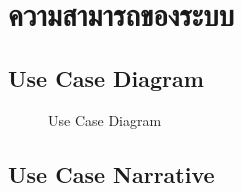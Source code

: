 \section{ความสามารถของระบบ}
\subsection{Use Case Diagram}
\begin{figure}[!h]\centering
    \setlength{\fboxrule}{0.2mm} %
    \setlength{\fboxsep}{0.5cm}
    \caption{Use Case Diagram}\label{fig:model8}
\end{figure}
\subsection{Use Case Narrative}
